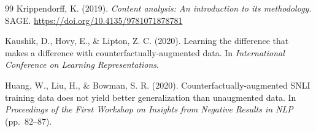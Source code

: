 \begin{thebibliography}{99}
Krippendorff, K. (2019). \textit{Content analysis: An introduction to its
methodology}. SAGE. \url{https://doi.org/10.4135/9781071878781}

Kaushik, D., Hovy, E., \& Lipton, Z. C. (2020). Learning the difference that
makes a difference with counterfactually-augmented data. In
\textit{International Conference on Learning Representations}.

Huang, W., Liu, H., \& Bowman, S. R. (2020). Counterfactually-augmented SNLI
training data does not yield better generalization than unaugmented data. In
\textit{Proceedings of the First Workshop on Insights from Negative Results in
NLP} (pp.~82--87).

\end{thebibliography}
